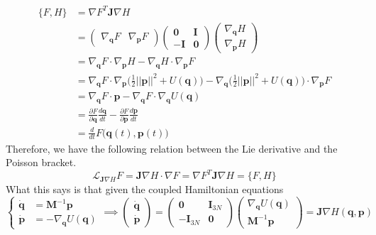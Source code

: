 \documentclass{article}
\theoremstyle{remark}
\theoremstyle{definition}
\begin{document}
\begin{align*}
    \{F, H\} & = \nabla F^T \mathbf{J} \nabla H \\
    & = \begin{pmatrix}
    \nabla_\mathbf{q} F & \nabla_\mathbf{p} F 
    \end{pmatrix} \begin{pmatrix}
     \mathbf{0} & \mathbf{I} \\ -\mathbf{I} & \mathbf{0} 
    \end{pmatrix} \begin{pmatrix}
    \nabla_\mathbf{q} H \\ \nabla_\mathbf{p} H
    \end{pmatrix} \\
    & = \nabla_\mathbf{q} F \cdot \nabla_\mathbf{p} H - \nabla_\mathbf{q} H \cdot \nabla_\mathbf{p} F \\
    & = \nabla_\mathbf{q} F \cdot \nabla_\mathbf{p} \bigg( \frac{1}{2} ||\mathbf{p}||^2 + U(\mathbf{q}) \bigg) - \nabla_\mathbf{q} \bigg( \frac{1}{2} ||\mathbf{p}||^2 + U(\mathbf{q}) \bigg)  \cdot \nabla_\mathbf{p} F \\
    & = \nabla_\mathbf{q} F \cdot \mathbf{p} - \nabla_\mathbf{q} F \cdot \nabla_\mathbf{q} U(\mathbf{q}) \\
    & = \frac{\partial F}{\partial \mathbf{q}} \frac{ d \mathbf{q}}{d t} - \frac{\partial F}{\partial \mathbf{p}} \frac{d \mathbf{p}}{d t} \\
    & = \frac{d}{d t} F \big( \mathbf{q}(t), \mathbf{p}(t) \big) 
\end{align*}
Therefore, we have the following relation between the Lie derivative and the Poisson bracket. 
\[\mathcal{L}_{\mathbf{J} \nabla H} F = \mathbf{J} \nabla H \cdot \nabla F = \nabla F^T \mathbf{J} \nabla H = \{F, H\}\]
What this says is that given the coupled Hamiltonian equations
\[\begin{cases} \boldsymbol{\dot{q}} & = \mathbf{M}^{-1} \mathbf{p} \\
\boldsymbol{\dot{p}} & = - \nabla_\mathbf{q} U(\mathbf{q}) \end{cases} \implies \begin{pmatrix} \boldsymbol{\dot{q}} \\ \boldsymbol{\dot{p}} \end{pmatrix} = \begin{pmatrix} \mathbf{0} & \mathbf{I}_{3N} \\ -\mathbf{I}_{3N} & \mathbf{0} \end{pmatrix} \begin{pmatrix} \nabla_\mathbf{q} U (\mathbf{q})\\ \mathbf{M}^{-1} \mathbf{p} \end{pmatrix} = \mathbf{J} \nabla H(\mathbf{q}, \mathbf{p})\]
\end{document}

